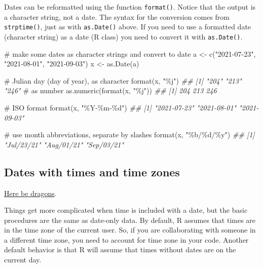\documentclass[
  13,
  letterpaper,
]{report}
\newenvironment{Shaded}{\begin{snugshade}}{\end{snugshade}}
\newcommand{\CommentTok}[1]{\textcolor[rgb]{0.37,0.37,0.37}{#1}}
\newcommand{\DocumentationTok}[1]{\textcolor[rgb]{0.37,0.37,0.37}{\textit{#1}}}
\newcommand{\FunctionTok}[1]{\textcolor[rgb]{0.28,0.35,0.67}{#1}}
\newcommand{\NormalTok}[1]{\textcolor[rgb]{0.00,0.23,0.31}{#1}}
\newcommand{\OtherTok}[1]{\textcolor[rgb]{0.00,0.23,0.31}{#1}}
\newcommand{\StringTok}[1]{\textcolor[rgb]{0.13,0.47,0.30}{#1}}
\begin{document}
Dates can be reformatted using the function \texttt{format()}. Notice
that the output is a character string, not a date. The syntax for the
conversion comes from \texttt{strptime()}, just as with
\texttt{as.Date()} above. If you need to use a formatted date (character
string) as a date (R class) you need to convert it with
\texttt{as.Date()}.

\begin{Shaded}
\begin{Highlighting}[]

\CommentTok{\# make some dates as character strings and convert to date}
\NormalTok{a }\OtherTok{\textless{}{-}} \FunctionTok{c}\NormalTok{(}\StringTok{"2021{-}07{-}23"}\NormalTok{, }\StringTok{"2021{-}08{-}01"}\NormalTok{, }\StringTok{"2021{-}09{-}03"}\NormalTok{)}
\NormalTok{x }\OtherTok{\textless{}{-}} \FunctionTok{as.Date}\NormalTok{(a)}

\CommentTok{\# Julian day (day of year), as character}
\FunctionTok{format}\NormalTok{(x, }\StringTok{"\%j"}\NormalTok{)}
\DocumentationTok{\#\# [1] "204" "213" "246"}
\CommentTok{\# as number}
\FunctionTok{as.numeric}\NormalTok{(}\FunctionTok{format}\NormalTok{(x, }\StringTok{"\%j"}\NormalTok{))}
\DocumentationTok{\#\# [1] 204 213 246}

\CommentTok{\# ISO format}
\FunctionTok{format}\NormalTok{(x, }\StringTok{"\%Y{-}\%m{-}\%d"}\NormalTok{)}
\DocumentationTok{\#\# [1] "2021{-}07{-}23" "2021{-}08{-}01" "2021{-}09{-}03"}

\CommentTok{\# use month abbreviations, separate by slashes}
\FunctionTok{format}\NormalTok{(x, }\StringTok{"\%b/\%d/\%y"}\NormalTok{)}
\DocumentationTok{\#\# [1] "Jul/23/21" "Aug/01/21" "Sep/03/21"}
\end{Highlighting}
\end{Shaded}

\subsection{Dates with times and time zones}\label{sec-05-date-time}

\href{https://en.wikipedia.org/wiki/Here_be_dragons}{Here be dragons}.

Things get more complicated when time is included with a date, but the
basic procedures are the same as date-only data. By default, R assumes
that times are in the time zone of the current user. So, if you are
collaborating with someone in a different time zone, you need to account
for time zone in your code. Another default behavior is that R will
assume that times without dates are on the current day.
\end{document}
